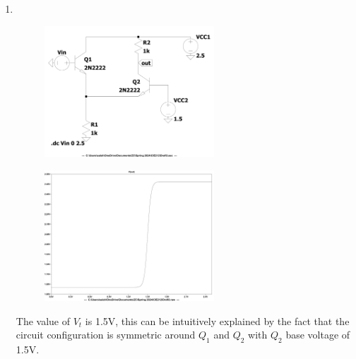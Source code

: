 \documentclass{zc-ust-hw}
\begin{document}
\begin{enumerate}
  \item \,
    \begin{figure}[h]
      \centering
      \includegraphics[width=0.6\textwidth]{figures/2-dc-circuit.pdf}
      \caption{}
    \end{figure}
    \begin{figure}[h]
      \centering
      \includegraphics[width=0.6\textwidth]{figures/2-dc-graph.pdf}
      \caption{}
    \end{figure}

    The value of \( V_{t} \) is 1.5V, this can be intuitively explained by
    the fact that the circuit configuration is symmetric around \( Q_{1} \) and
    \( Q_{2} \) with \( Q_{2} \) base voltage of 1.5V.


\end{enumerate}
\end{document}
